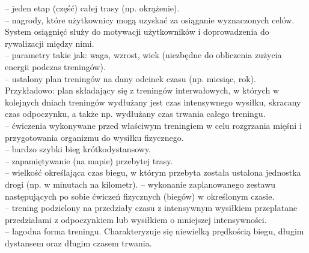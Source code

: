 \begin{multicols}{2}
\begin{description}
	-- jeden etap (część) całej trasy (np. okrążenie).\\
	-- nagrody, które użytkownicy mogą uzyskać za osiąganie wyznaczonych celów. System osiągnięć służy do motywacji użytkowników i doprowadzenia do rywalizacji między nimi.\\
	-- parametry takie jak: waga, wzrost, wiek (niezbędne do obliczenia zużycia energii podczas treningów).\\
	-- ustalony plan treningów na dany odcinek czasu (np. miesiąc, rok). Przykładowo: plan składający się z treningów interwałowych, w których w kolejnych dniach treningów wydłużany jest czas intensywnego wysiłku, skracany czas odpoczynku, a także np. wydłużany czas trwania całego treningu.\\
	-- ćwiczenia wykonywane przed właściwym treningiem w celu rozgrzania mięśni i przygotowania organizmu do wysiłku fizycznego.\\
	-- bardzo szybki bieg krótkodystansowy.\\
	-- zapamiętywanie (na mapie) przebytej trasy.\\
	-- wielkość określająca czas biegu, w którym przebyta została ustalona jednostka drogi (np. w minutach na kilometr).
	-- wykonanie zaplanowanego zestawu następujących po sobie ćwiczeń fizycznych (biegów) w określonym czasie. \\
	-- trening podzielony na przedziały czasu z intensywnym wysiłkiem przeplatane przedziałami z odpoczynkiem lub wysiłkiem o mniejszej intensywności.\\
	-- łagodna forma treningu. Charakteryzuje się niewielką prędkością biegu, długim dystansem oraz długim czasem trwania.\\
  \end{description}
\end{multicols}

